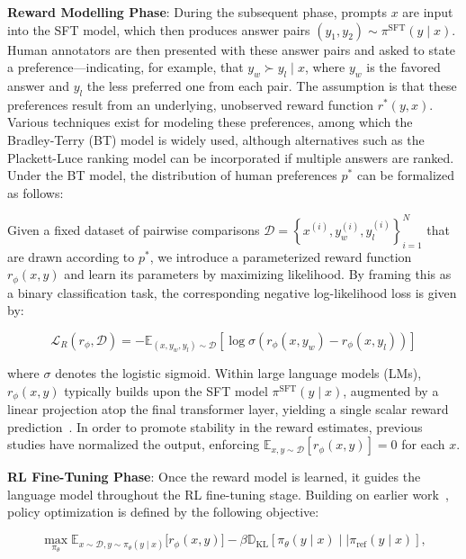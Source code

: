 \textbf{Reward Modelling Phase}: During the subsequent phase, prompts $x$ are input into the SFT model, which then produces answer pairs $(y_1, y_2)\sim \pi^\text{SFT}(y \mid x)$. Human annotators are then presented with these answer pairs and asked to state a preference—indicating, for example, that $y_w\succ y_l \mid x$, where $y_w$ is the favored answer and $y_l$ the less preferred one from each pair. The assumption is that these preferences result from an underlying, unobserved reward function $r^*(y, x)$. Various techniques exist for modeling these preferences, among which the Bradley-Terry (BT) model \cite{bradley1952rankanalysis} is widely used, although alternatives such as the Plackett-Luce ranking model \citep{plackett1975analysis, luce2012individual} can be incorporated if multiple answers are ranked. Under the BT model, the distribution of human preferences $p^*$ can be formalized as follows:

Given a fixed dataset of pairwise comparisons $\mathcal{D} = \left\{ x^{(i)}, y_w^{(i)}, y_l^{(i)} \right\}_{i=1}^N$ that are drawn according to $p^*$, we introduce a parameterized reward function $r_{\phi}(x, y)$ and learn its parameters by maximizing likelihood. By framing this as a binary classification task, the corresponding negative log-likelihood loss is given by:

\begin{equation}\label{eq:reward_model}
    \mathcal{L}_R(r_{\phi}, \mathcal{D}) = -\mathbb{E}_{(x, y_w, y_l)\sim \mathcal{D}}\left[ \log \sigma \left( r_{\phi}(x, y_w) - r_{\phi}(x, y_l) \right) \right]
\end{equation}

where $\sigma$ denotes the logistic sigmoid. Within large language models (LMs), $r_{\phi}(x, y)$ typically builds upon the SFT model $\pi^\text{SFT}(y \mid x)$, augmented by a linear projection atop the final transformer layer, yielding a single scalar reward prediction~\cite{ziegler2020finetuning}. In order to promote stability in the reward estimates, previous studies have normalized the output, enforcing $\mathbb{E}_{x,y\sim \mathcal{D}}[r_\phi(x, y)] = 0$ for each $x$.

\textbf{RL Fine-Tuning Phase}: Once the reward model is learned, it guides the language model throughout the RL fine-tuning stage. Building on earlier work~\citep{jaques2017sequence, jaques2020human}, policy optimization is defined by the following objective:

\begin{equation}\label{eq:RL}
\max_{\pi_{\theta}} \mathbb{E}_{x\sim \mathcal{D}, y\sim \pi_{\theta}(y \mid x)} \bigl[ r_{\phi}(x, y) \bigr] - \beta \mathbb{D}_{\textrm{KL}}\left[ \pi_{\theta}(y\mid x) \mid \mid \pi_\text{ref}(y\mid x) \right],
\end{equation}

